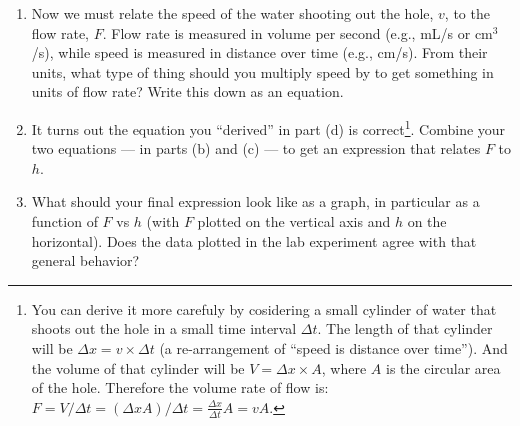 \documentclass[12pt]{article}
\begin{document}
\begin{enumerate}
\begin{enumerate}
	This says that the sum of the pressure of a fluid, $P$, plus its graviational energy density\footnote{$\rho$ is the {\em mass density of the fluid} (\unit{1}{\gram/\milli\liter}  = \unit{1000}{\kilo\gram/\meter^3} for water); and $g = \unit{10}{\meter/\second^2}$ is the so-called {\em acceleration due to gravity} constant.}, $\rho g h$ , plus its kinetic energy density, $\frac{1}{2} \rho v^2$, is equal at any two points ($A$ and $B$) along a streamline of a fluid.  To apply this to our lab, where the ``fluid'' is the water in the GC, we pick our points $A$ and $B$ to be at the top of water column and where the water shoots out of the hole, respectively.  Because both of these points are exposed to the atmosphere, the fluid pressures are the same: $P_A = P_B = P_\text{atm}$.  Because, at equilibrium, the water level is not changing, what is $v_A$, at the top of the water column?  If we say that the height of the hole is our zero value, $h_B=0$, then $h_A = h$ is simply our ``height above the hole.''  \underline{Make all of these replacements in the above equation} and you should arrive at an equation that relates $v_B$, the speed of water shooting out of the hole, to $h_B$,  the height of the water level above the hole.  We can just call these $v$ and $h$ from now on.
	\item Now we must relate the speed of the water shooting out the hole, $v$, to the flow rate, $F$.  Flow rate is measured in volume per second (e.g., mL/s or $\text{cm}^3$/s), while speed is measured in distance over time (e.g., cm/s).  From their units, what type of thing should you multiply speed by to get something in units of flow rate?  Write this down as an equation.
	\item It turns out the equation you ``derived'' in part (d) is correct\footnote{You can derive it more carefuly by cosidering a small cylinder of water that shoots out the hole in a small time interval $\Delta t$.  The length of that cylinder will be $\Delta x = v \times \Delta t$ (a re-arrangement of ``speed is distance over time'').  And the volume of that cylinder will be $V = \Delta x \times A$, where $A$ is the circular area of the hole.  Therefore the volume rate of flow is: $F = V / \Delta t = \left( \Delta x A \right) / \Delta t = \frac{\Delta x}{\Delta t} A = v  A$.}.  Combine your two equations --- in parts (b) and (c) --- to get an expression that relates $F$ to $h$.
	\item What should your final expression look like as a graph, in particular as a function of $F$ vs $h$ (with $F$ plotted on the vertical axis and $h$ on the horizontal). Does the data plotted in the lab experiment agree with that general behavior?

\end{enumerate}
\end{enumerate}
\end{document}
